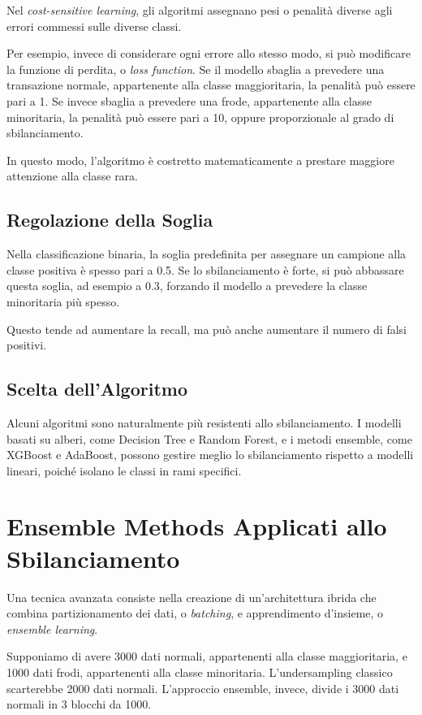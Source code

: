 \documentclass[11pt, a4paper]{article}
\begin{document}
Nel \emph{cost-sensitive learning}, gli algoritmi assegnano pesi o penalità
diverse agli errori commessi sulle diverse classi.

Per esempio, invece di considerare ogni errore allo stesso modo, si può
modificare la funzione di perdita, o \emph{loss function}. Se il modello sbaglia
a prevedere una transazione normale, appartenente alla classe maggioritaria, la
penalità può essere pari a 1. Se invece sbaglia a prevedere una frode,
appartenente alla classe minoritaria, la penalità può essere pari a 10, oppure
proporzionale al grado di sbilanciamento.

In questo modo, l'algoritmo è costretto matematicamente a prestare maggiore
attenzione alla classe rara.

\subsection{Regolazione della Soglia}

Nella classificazione binaria, la soglia predefinita per assegnare un campione
alla classe positiva è spesso pari a 0.5. Se lo sbilanciamento è forte, si può
abbassare questa soglia, ad esempio a 0.3, forzando il modello a prevedere la
classe minoritaria più spesso.

Questo tende ad aumentare la recall, ma può anche aumentare il numero di falsi
positivi.

\subsection{Scelta dell'Algoritmo}

Alcuni algoritmi sono naturalmente più resistenti allo sbilanciamento. I modelli
basati su alberi, come Decision Tree e Random Forest, e i metodi ensemble, come
XGBoost e AdaBoost, possono gestire meglio lo sbilanciamento rispetto a modelli
lineari, poiché isolano le classi in rami specifici.

\section{Ensemble Methods Applicati allo Sbilanciamento}

Una tecnica avanzata consiste nella creazione di un'architettura ibrida che
combina partizionamento dei dati, o \emph{batching}, e apprendimento d'insieme,
o \emph{ensemble learning}.

Supponiamo di avere 3000 dati normali, appartenenti alla classe maggioritaria, e
1000 dati frodi, appartenenti alla classe minoritaria. L'undersampling classico
scarterebbe 2000 dati normali. L'approccio ensemble, invece, divide i 3000 dati
normali in 3 blocchi da 1000.
\end{document}
